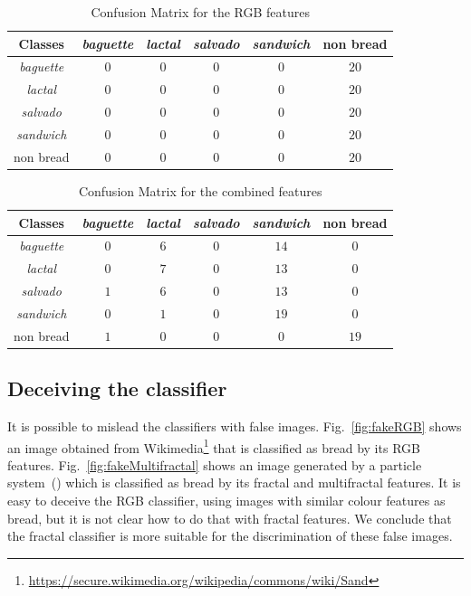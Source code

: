 \documentclass[oneside,a4paper,english,links]{amca}
\begin{document}
\begin{table}[htb]
\centering
\begin{tabular}{|c|c|c|c|c|c|}
    \hline
    Classes & {\em baguette} & {\em lactal} & {\em salvado} & {\em sandwich} & non bread\\
    \hline
    \hline
    {\em baguette}  & $0$ & $0$ & $0$ & $0$ & $20$\\
    \hline
    {\em lactal}    & $0$ & $0$ & $0$ & $0$ & $20$\\
    \hline
    {\em salvado}   & $0$ & $0$ & $0$ & $0$ & $20$\\
    \hline
    {\em sandwich}  & $0$ & $0$ & $0$ & $0$ & $20$\\
    \hline
    non bread       & $0$ & $0$ & $0$ & $0$ & $20$\\
    \hline
\end{tabular}
\caption{Confusion Matrix for the RGB features}
\label{table:ConfusionMatrixNonFractal}
\end{table}

\begin{table}[ht!b]
\centering
\begin{tabular}{|c|c|c|c|c|c|}
    \hline
    Classes & {\em baguette} & {\em lactal} & {\em salvado} & {\em sandwich} & non bread\\
    \hline
    \hline
    {\em baguette}   & $0$ & $6$ & $0$ & $14$ & $0$\\
    \hline
    {\em lactal}     & $0$ & $7$ & $0$ & $13$ & $0$\\
    \hline
    {\em salvado}    & $1$ & $6$ & $0$ & $13$ & $0$\\
    \hline
    {\em sandwich}   & $0$ & $1$ & $0$ & $19$ & $0$\\
    \hline
    non bread        & $1$ & $0$ & $0$ & $0$  & $19$\\
    \hline
\end{tabular}
\caption{Confusion Matrix for the combined features}
\label{table:ConfusionMatrixCombined}
\end{table}

\subsection{Deceiving the classifier}
It is possible to mislead the classifiers with false images. Fig.~\ref{fig:fakeRGB} shows an image obtained from Wikimedia\footnote{\url{https://secure.wikimedia.org/wikipedia/commons/wiki/Sand}} that is classified as bread by its RGB features. Fig.~\ref{fig:fakeMultifractal} shows an image generated by a particle system~(\cite{Baravalle2011}) which is classified as bread by its fractal and multifractal features. It is easy to deceive the RGB classifier, using images with similar colour features as bread, but it is not clear how to do that with fractal features. We conclude that the fractal classifier is more suitable for the discrimination of these false images.
\end{document}
